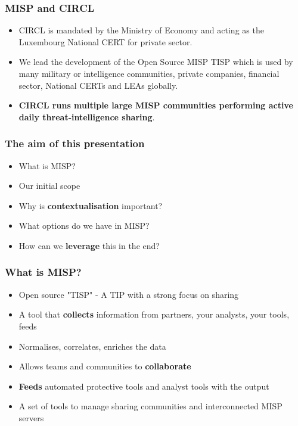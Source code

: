 
\begin{frame}
\titlepage
\end{frame}

\begin{frame}
  \frametitle{MISP and CIRCL}
  \begin{itemize}
    \item CIRCL is mandated by the Ministry of Economy and acting as the Luxembourg National CERT for private sector.
    \item We lead the development of the Open Source MISP TISP which is used by many military or intelligence communities, private companies, financial sector, National CERTs and LEAs globally.
    \item {\bf CIRCL runs multiple large MISP communities performing active daily threat-intelligence sharing}.
  \end{itemize}
\end{frame}

\begin{frame}
  \frametitle{The aim of this presentation}
  \begin{itemize}
     \item What is MISP?
     \item Our initial scope
     \item Why is {\bf contextualisation} important?
     \item What options do we have in MISP?
     \item How can we {\bf leverage} this in the end?
  \end{itemize}
\end{frame}

\begin{frame}
\frametitle{What is MISP?}
\begin{itemize}
       \item Open source "TISP" - A TIP with a strong focus on sharing
       \item A tool that {\bf collects} information from partners, your analysts, your tools, feeds
       \item Normalises, correlates, enriches the data
       \item Allows teams and communities to {\bf collaborate}
       \item {\bf Feeds} automated protective tools and analyst tools with the output
       \item A set of tools to manage sharing communities and interconnected MISP servers
\end{itemize}
\end{frame}

